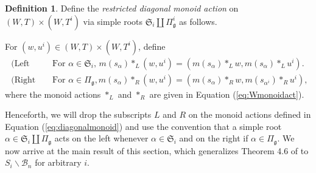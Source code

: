 \documentclass[12pt]{amsart}
\numberwithin{equation}{section}
\theoremstyle{remark}
\theoremstyle{definition}
\newtheorem{dfn}[thm]{Definition}
\newcommand{\fk}{\mbox{${\mathfrak k}$}}
\newcommand{\fg}{\mbox{${\mathfrak g}$}}
\newcommand{\B}{\mathcal{B}}
\begin{document}
\begin{dfn}\label{d:diagonal}
Define the \emph{restricted diagonal monoid action} on $(W,T)\times (W,T^{i})$ via simple roots $\mathfrak{S}_i\coprod \Pi_{\fg}^{i}$ as follows. 

  
For $(w,u^{i})\in (W,T)\times (W,T^{i})$, define
\begin{equation}\label{eq:diagonalmonoid}
\begin{split}
\mbox{ (Left action)} &\mbox{ For } \alpha\in\mathfrak{S}_i,\, m(s_{\alpha})*_{L}(w,u^{i})=(m(s_{\alpha})*_{L}w, m(s_{\alpha})*_{L}u^{i}).\\
\mbox{ (Right action)} &\mbox{ For } \alpha\in\Pi_{\fg}, m(s_{\alpha})*_{R}(w,u^{i})=(m(s_{\alpha})*_{R}w, m(s_{\alpha^{i}})*_{R}u^{i}),
\end{split}
\end{equation}
where the monoid actions $*_{L}$ and $*_{R}$ are given in Equation (\ref{eq:Wmonoidact}).
\end{dfn}
Henceforth, we will drop the subscripts $L$ and $R$ on the monoid actions defined in Equation (\ref{eq:diagonalmonoid}) and use the convention that a simple root $\alpha\in\mathfrak{S}_i\coprod \Pi_{\fg}$ acts on the left whenever $\alpha\in \mathfrak{S}_i$ and on the right if $\alpha\in\Pi_{\fg}$.  We now arrive at the main result of this section, which generalizes Theorem 4.6 of \cite{Shpairs} to $S_{i}\backslash\B_{n}$ for arbitrary $i$.  
\end{document}

